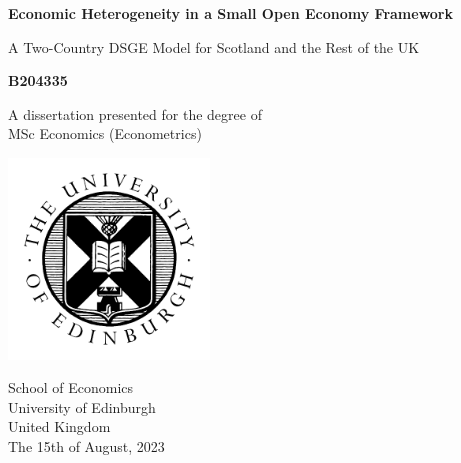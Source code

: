 \begin{titlepage}
    \begin{center}
        \vspace*{1cm}
        \LARGE
        \textbf{Economic Heterogeneity in a Small Open Economy Framework}
 
        \vspace{0.5cm}
        A Two-Country DSGE Model for Scotland and the Rest of the UK
             
        \vspace{1.5cm}
 
        \textbf{B204335}
 
        \vfill
             
        A dissertation presented for the degree of\\
        MSc Economics (Econometrics) 
             
        \vspace{0.8cm}
      
        \includegraphics[width=0.4\textwidth]{./title_page/uoe_logo.png}
             
        School of Economics\\
        University of Edinburgh\\
        United Kingdom\\
        The 15th of August, 2023
             
    \end{center}
 \end{titlepage}